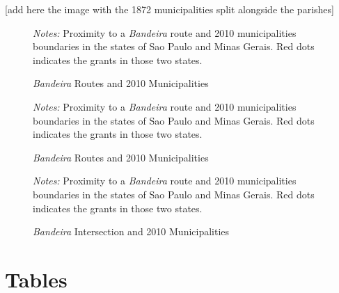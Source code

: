 \documentclass{article}
\begin{document}
\clearpage

[add here the image with the 1872 municipalities split alongside the parishes]

\clearpage

\begin{figure}[h!]
  \caption{\textit{Bandeira} Routes and 2010 Municipalities}
  \begin{center}
  \end{center}
  \textit{Notes:} Proximity to a \textit{Bandeira} route and 2010 municipalities boundaries in the states of Sao Paulo and Minas Gerais. Red dots indicates the grants in those two states.
  \label{fig:bandeira_dist}
\end{figure}

\begin{figure}[h!]
  \caption{\textit{Bandeira} Routes and 2010 Municipalities \label{fig:bandeira_dist_graph}}
  \begin{center}
  \end{center}
  \textit{Notes:} Proximity to a \textit{Bandeira} route and 2010 municipalities boundaries in the states of Sao Paulo and Minas Gerais. Red dots indicates the grants in those two states.
  \label{fig:bandeira_dist_graph}
\end{figure}

\begin{figure}[h!]
  \caption{\textit{Bandeira} Intersection and 2010 Municipalities}
  \begin{center}
  \end{center}
  \textit{Notes:} Proximity to a \textit{Bandeira} route and 2010 municipalities boundaries in the states of Sao Paulo and Minas Gerais. Red dots indicates the grants in those two states.
  \label{fig:bandeiras_SE_treat}
\end{figure}

\clearpage

\section{Tables}
\end{document}
